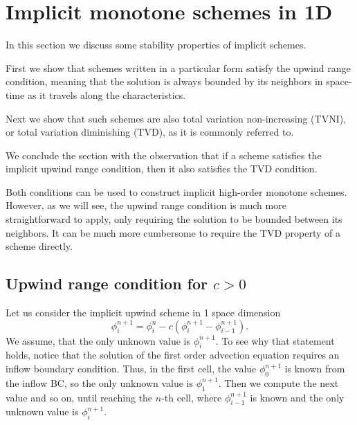 \documentclass[../thesis.tex]{subfiles}
\begin{document}
\section{Implicit monotone schemes in 1D}
In this section we discuss some stability properties of implicit schemes.

First we show that schemes written in a particular form satisfy the upwind range condition, meaning that the solution is
always bounded by its neighbors in space-time
as it travels along the characteristics.

Next we show that such schemes are also total variation non-increasing (TVNI),
or total variation diminishing (TVD), as it is commonly referred to.

We conclude the section with the observation that if a scheme satisfies the
implicit upwind range condition, then it also satisfies the TVD condition.

Both conditions can be used to construct implicit high-order monotone schemes.
However, as we will see, the upwind range condition is much more straightforward to
apply, only requiring the solution to be bounded between its neighbors. It can be much more cumbersome to require the TVD property of a scheme directly.
\subsection[]{Upwind range condition for \(c > 0\)}
Let us consider the implicit upwind scheme in 1 space dimension
\begin{equation}\label{eqn:implicit-upwind-1d}
    \phi_{i}^{n+1} =
    \phi_{i}^{n} - c\left( \phi_{i}^{n+1} - \phi_{i-1}^{n+1} \right).
\end{equation}
We assume, that the only unknown value is \(\phi_{i}^{n+1}\).
To see why that statement holds, notice that the solution of the first order advection
equation requires an inflow boundary condition. Thus, in the first cell, the value \(\phi_{0}^{n+1}\) is known from the inflow BC, so the only unknown value is \(\phi_{1}^{n+1}\). Then we compute the next value and so on, until reaching the \(n\)-th cell, where \(\phi_{i-1}^{n+1}\) is known and the only unknown value is \(\phi_{i}^{n+1}\).
\end{document}
